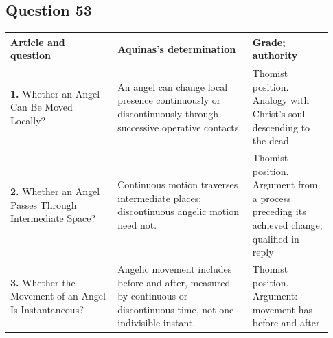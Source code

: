 \subsection{Question 53}
\begin{longtable}{@{}>{\raggedright\arraybackslash}p{0.31\linewidth}>{\raggedright\arraybackslash}p{0.39\linewidth}>{\raggedright\arraybackslash}p{0.23\linewidth}@{}}
\toprule
Article and question & Aquinas's determination & Grade; authority\\
\midrule\endhead
\textbf{1.} Whether an Angel Can Be Moved Locally? & An angel can change local presence continuously or discontinuously through successive operative contacts. & Thomist position. Analogy with Christ's soul descending to the dead\\
\textbf{2.} Whether an Angel Passes Through Intermediate Space? & Continuous motion traverses intermediate places; discontinuous angelic motion need not. & Thomist position. Argument from a process preceding its achieved change; qualified in reply\\
\textbf{3.} Whether the Movement of an Angel Is Instantaneous? & Angelic movement includes before and after, measured by continuous or discontinuous time, not one indivisible instant. & Thomist position. Argument: movement has before and after\\
\bottomrule
\end{longtable}
